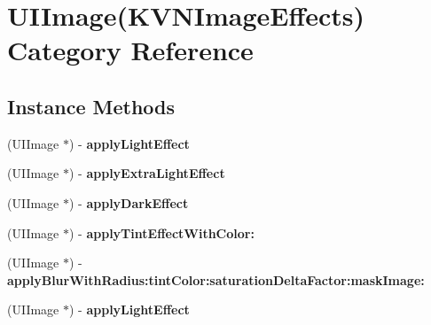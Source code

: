\hypertarget{category_u_i_image_07_k_v_n_image_effects_08}{}\section{U\+I\+Image(K\+V\+N\+Image\+Effects) Category Reference}
\label{category_u_i_image_07_k_v_n_image_effects_08}
\subsection*{Instance Methods}
\begin{DoxyCompactItemize}
\item 
\mbox{\label{category_u_i_image_07_k_v_n_image_effects_08_a0bc4ead8a6ba21153bc16077cc829e18}} 
(U\+I\+Image $\ast$) -\/ {\bfseries apply\+Light\+Effect}
\item 
\mbox{\label{category_u_i_image_07_k_v_n_image_effects_08_ab9ba480faa581daadfb3b48958f3cb42}} 
(U\+I\+Image $\ast$) -\/ {\bfseries apply\+Extra\+Light\+Effect}
\item 
\mbox{\label{category_u_i_image_07_k_v_n_image_effects_08_a0d908f41126769c4bfc4a0997a6c8b44}} 
(U\+I\+Image $\ast$) -\/ {\bfseries apply\+Dark\+Effect}
\item 
\mbox{\label{category_u_i_image_07_k_v_n_image_effects_08_a710daf890ddde86dcfe1193520a167da}} 
(U\+I\+Image $\ast$) -\/ {\bfseries apply\+Tint\+Effect\+With\+Color\+:}
\item 
\mbox{\label{category_u_i_image_07_k_v_n_image_effects_08_ade5cf838112fae8cb8a744233d20395b}} 
(U\+I\+Image $\ast$) -\/ {\bfseries apply\+Blur\+With\+Radius\+:tint\+Color\+:saturation\+Delta\+Factor\+:mask\+Image\+:}
\item 
\mbox{\label{category_u_i_image_07_k_v_n_image_effects_08_a0bc4ead8a6ba21153bc16077cc829e18}} 
(U\+I\+Image $\ast$) -\/ {\bfseries apply\+Light\+Effect}
\item 
\mbox{\label{category_u_i_image_07_k_v_n_image_effects_08_ab9ba480faa581daadfb3b48958f3cb42}} 

\end{DoxyCompactItemize}
